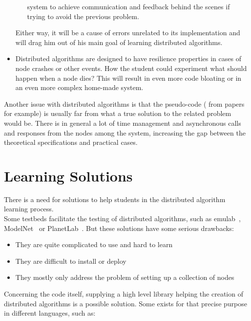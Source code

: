 \documentclass{eplmastersthesis}
\begin{document}
\begin{itemize}
\begin{itemize}
            system to achieve communication and feedback behind the scenes if
            trying to avoid the previous problem.
          \end{itemize}
        Either way, it will be a cause of errors unrelated to its
        implementation and will drag him out of his main goal of learning
        distributed algorithms.
        \item Distributed algorithms are designed to have resilience
        properties in cases of node crashes or other events. How the student
        could experiment what should happen when a node dies? This will result
        in even more code bloating or in an even more complex home-made system.
      \end{itemize}

      Another issue with distributed algorithms is that the pseudo-code (
      from papers for example) is usually far from what a true solution to the
      related problem would be. There is in general a lot of time management
      and asynchronous calls and responses from the nodes among the system,
      increasing the gap between the theoretical specifications and practical
      cases.

    \section{Learning Solutions}

      There is a need for solutions to help students in the distributed
      algorithm learning process.\\

      Some testbeds facilitate the testing of distributed algorithms, such as
      emulab~\cite{Emulab}, ModelNet~\cite{ModelNet} or
      PlanetLab~\cite{PlanetLab}. But these solutions have some serious
      drawbacks:

      \begin{itemize}
        \item They are quite complicated to use and hard to learn
        \item They are difficult to install or deploy
        \item They mostly only address the problem of setting up a collection
        of nodes
      \end{itemize}

      Concerning the code itself, supplying a high level library helping the
      creation of distributed algorithms is a possible solution. Some
      exists for that precise purpose in different languages, such as:
\end{document}
